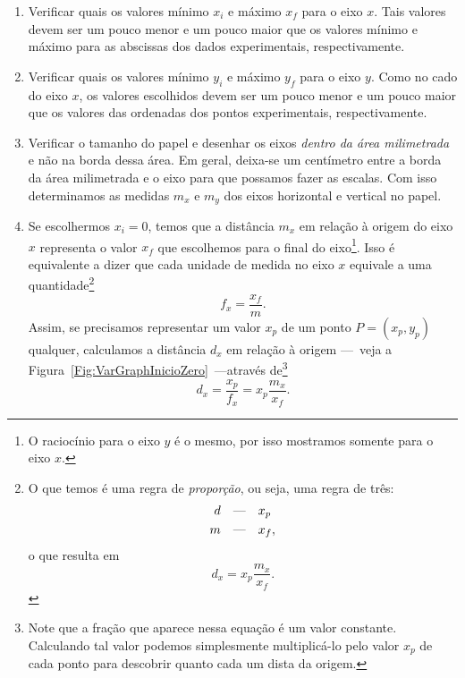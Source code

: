 \begin{enumerate}
	\item Verificar quais os valores mínimo $x_i$ e máximo $x_f$ para o eixo $x$. Tais valores devem ser um pouco menor e um pouco maior que os valores mínimo e máximo para as abscissas dos dados experimentais, respectivamente.
	\item Verificar quais os valores mínimo $y_i$ e máximo $y_f$ para o eixo $y$. Como no cado do eixo $x$, os valores escolhidos devem ser um pouco menor e um pouco maior que os valores das ordenadas dos pontos experimentais, respectivamente.
	\item Verificar o tamanho do papel e desenhar os eixos \emph{dentro da área milimetrada} e não na borda dessa área. Em geral, deixa-se um centímetro entre a borda da área milimetrada e o eixo para que possamos fazer as escalas. Com isso determinamos as medidas $m_x$ e $m_y$ dos eixos horizontal e vertical no papel.
	\item Se escolhermos $x_i = 0$, temos que a distância $m_x$ em relação à origem do eixo $x$ representa o valor $x_f$ que escolhemos para o final do eixo\footnote{O raciocínio para o eixo $y$ é o mesmo, por isso mostramos somente para o eixo $x$.}. Isso é equivalente a dizer que cada unidade de medida no eixo $x$ equivale a uma quantidade\footnote{O que temos é uma regra de \emph{proporção}, ou seja, uma regra de três: \begin{align} d &\quad\text{\textemdash}\quad x_p \\ m &\quad\text{\textemdash}\quad x_f, \end{align} o que resulta em \begin{equation} d_x = x_p \frac{m_x}{x_f}. \end{equation}}
	\begin{equation}
		f_x = \frac{x_f}{m}.
	\end{equation}
	Assim, se precisamos representar um valor $x_p$ de um ponto $P = (x_p,y_p)$ qualquer, calculamos a distância $d_x$ em relação à origem ---~veja a Figura~\ref{Fig:VarGraphInicioZero}~---através de\footnote{Note que a fração que aparece nessa equação é um valor constante. Calculando tal valor podemos simplesmente multiplicá-lo pelo valor $x_p$ de cada ponto para descobrir quanto cada um dista da origem.}
	\begin{equation}
		d_x = \frac{x_p}{f_x} = x_p \frac{m_x}{x_f}.
	\end{equation}


\end{enumerate}
